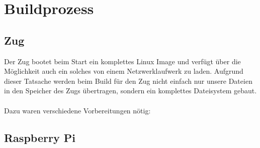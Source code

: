 \chapter{Buildprozess}

\section{Zug}

Der Zug bootet beim Start ein komplettes Linux Image und verfügt über die Möglichkeit auch ein solches von einem Netzwerklaufwerk zu laden. Aufgrund dieser Tatsache werden beim Build für den Zug nicht einfach nur unsere Dateien in den Speicher des Zugs übertragen, sondern ein komplettes Dateisystem gebaut.\\\\
Dazu waren verschiedene Vorbereitungen nötig:\\


\section{Raspberry Pi}
